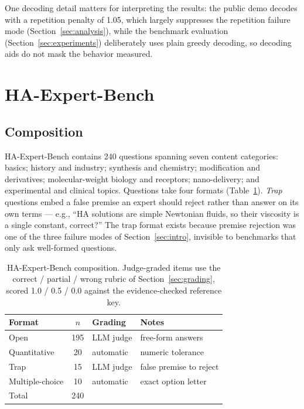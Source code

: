 \documentclass[11pt]{article}
\begin{document}
One decoding detail matters for interpreting the results: the public demo
decodes with a repetition penalty of 1.05, which largely suppresses the
repetition failure mode (Section~\ref{sec:analysis}), while the
benchmark evaluation (Section~\ref{sec:experiments}) deliberately uses
plain greedy decoding, so decoding aids do not mask the behavior
measured.

\section{HA-Expert-Bench}
\label{sec:bench}

\subsection{Composition}

HA-Expert-Bench contains 240 questions spanning seven content categories:
basics; history and industry; synthesis and chemistry; modification and
derivatives; molecular-weight biology and receptors; nano-delivery; and
experimental and clinical topics. Questions take four formats
(Table~\ref{tab:benchcomp}). \emph{Trap} questions embed a false premise
an expert should reject rather than answer on its own
terms --- e.g., ``HA solutions are simple Newtonian fluids, so their
viscosity is a single constant, correct?'' The trap format exists because
premise rejection was one of the three failure modes of
Section~\ref{sec:intro}, invisible to benchmarks that only ask
well-formed questions.

\begin{table}[t]
\centering
\begin{tabular}{lcll}
\toprule
Format & $n$ & Grading & Notes \\
\midrule
Open & 195 & LLM judge & free-form answers \\
Quantitative & 20 & automatic & numeric tolerance \\
Trap & 15 & LLM judge & false premise to reject \\
Multiple-choice & 10 & automatic & exact option letter \\
\midrule
Total & 240 & & \\
\bottomrule
\end{tabular}
\caption{HA-Expert-Bench composition. Judge-graded items use the
correct / partial / wrong rubric of Section~\ref{sec:grading}, scored
1.0 / 0.5 / 0.0 against the evidence-checked reference key.}
\label{tab:benchcomp}
\end{table}
\end{document}
